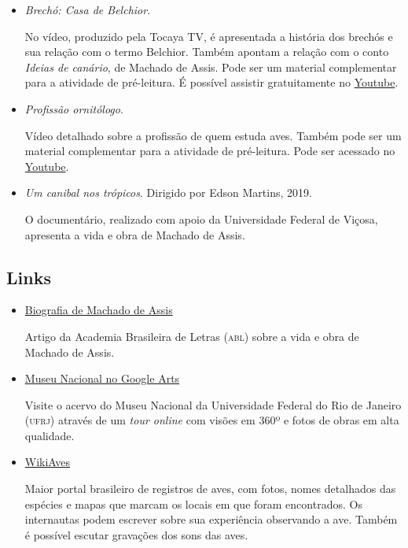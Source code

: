 \documentclass[11pt]{extarticle}
\begin{document}
\begin{itemize}

\item \textit{Brechó: Casa de Belchior}.

No vídeo, produzido pela Tocaya TV, é apresentada a história dos brechós e sua relação com o termo Belchior. Também apontam a relação com o conto \textit{Ideias de canário}, de Machado de Assis. Pode ser um material complementar para a atividade de pré-leitura. É possível assistir gratuitamente no \href{https://youtu.be/mGhzDNLkiV4}{Youtube}.

\item \textit{Profissão ornitólogo}.

Vídeo detalhado sobre a profissão de quem estuda aves. Também pode ser um material complementar para a atividade de pré-leitura. Pode ser acessado no \href{https://youtu.be/2swKMwcnYTM}{Youtube}.

\item \textit{Um canibal nos trópicos}. Dirigido por Edson Martins, 2019.

O documentário, realizado com apoio da Universidade Federal de Viçosa, apresenta a vida e obra de Machado de Assis.

\end{itemize}

\subsection{Links}

\begin{itemize}

\item \href{https://www.academia.org.br/academicos/machado-de-assis/biografia}{Biografia de Machado de Assis}

Artigo da Academia Brasileira de Letras (\textsc{abl}) sobre a vida e obra de Machado de Assis.

\item \href{https://artsandculture.google.com/partner/museu-nacional-ufrj}{Museu Nacional no Google Arts}

Visite o acervo do Museu Nacional da Universidade Federal do Rio de Janeiro (\textsc{ufrj}) através de um \textit{tour online} com visões em 360º e fotos de obras em alta qualidade.

\item \href{https://www.wikiaves.com.br/}{WikiAves}

Maior portal brasileiro de registros de aves, com fotos, nomes detalhados das espécies e mapas que marcam os locais em que foram encontrados. Os internautas podem escrever sobre sua experiência observando a ave. Também é possível escutar gravações dos sons das aves.

\end{itemize}
\end{document}
